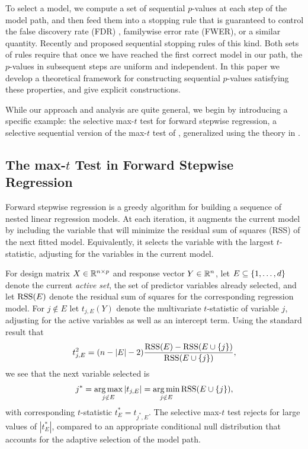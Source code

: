 \documentclass{article}
\begin{document}
To select a model, we compute a set of sequential $p$-values at each step of the model path, and then feed them into a stopping rule that is guaranteed to control the false discovery rate (FDR) \citep{benjamini1995controlling}, familywise error rate (FWER), or a similar quantity. Recently \citet{gsell2013sequential} and \citet{li2015accumulation} proposed sequential stopping rules of this kind. Both sets of rules require that once we have reached the first correct model in our path, the $p$-values in subsequent steps are uniform and independent. In this paper we develop a theoretical framework for constructing sequential $p$-values satisfying these properties, and give explicit constructions.

While our approach and analysis are quite general, we begin by introducing a specific example: the selective max-$t$ test for forward stepwise regression, a selective sequential version of the max-$t$ test of \citet{buja2014}, generalized using the theory in \citet{fithian2014optimal}.

\subsection{The max-$t$ Test in Forward Stepwise Regression}

Forward stepwise regression is a greedy algorithm for building a sequence of nested linear regression models. At each iteration, it augments the current model by including the variable that will minimize the residual sum of squares (RSS) of the next fitted model. Equivalently, it selects the variable with the largest $t$-statistic, adjusting for the variables in the current model.

For design matrix $X\in \mathbb{R}^{n\times p}$ and response vector $Y\in \mathbb{R}^n$, let $E \subseteq \{1, \ldots, d\}$ denote the current {\em active set}, the set of predictor variables already selected, and let $\text{RSS}(E)$ denote the residual sum of squares for the corresponding regression model. For $j\notin E$ let $t_{j,E}(Y)$ denote the multivariate $t$-statistic of variable $j$, adjusting for the active variables as well as an intercept term. Using the standard result that
\begin{equation}
t_{j,E}^2 = (n-|E|-2) \frac{\text{RSS}(E) - \text{RSS}(E \cup \{j\})}{\text{RSS}(E \cup \{j\})},
\end{equation}
we see that the next variable selected is 
\begin{equation}
j^* = \operatorname*{arg\,max}_{j\notin E} |t_{j,E}| = \operatorname*{arg\,min}_{j\notin E} \text{RSS}(E \cup \{j\}),
\end{equation}
with corresponding $t$-statistic $t_E^* = t_{j^*,E}$. The selective max-$t$ test rejects for large values of $|t_E^*|$, compared to an appropriate conditional null distribution that accounts for the adaptive selection of the model path.
\end{document}
